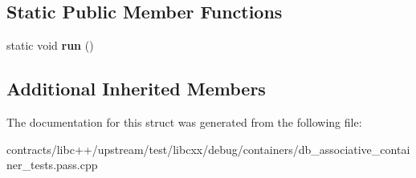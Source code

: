 \subsection*{Static Public Member Functions}
\begin{DoxyCompactItemize}
\item 
\mbox{\label{struct_associative_container_checks_a549f47cb23b9e9ab4c9089ebcb0d898a}} 
static void {\bfseries run} ()
\end{DoxyCompactItemize}
\subsection*{Additional Inherited Members}


The documentation for this struct was generated from the following file\+:\begin{DoxyCompactItemize}
\item 
contracts/libc++/upstream/test/libcxx/debug/containers/db\+\_\+associative\+\_\+container\+\_\+tests.\+pass.\+cpp\end{DoxyCompactItemize}
